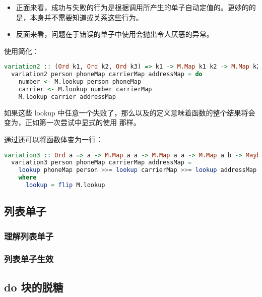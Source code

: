 \documentclass[./main.tex]{subfiles}
\begin{document}
\begin{itemize}
  \item 正面来看，成功与失败的行为是根据调用所产生的单子自动定值的。更妙的的是，本身并不需要知道或关系这些行为。
  \item 反面来看，问题在于错误的单子中使用会抛出令人厌恶的异常。
\end{itemize}

使用简化：

\begin{lstlisting}[language=Haskell]
  variation2 :: (Ord k1, Ord k2, Ord k3) => k1 -> M.Map k1 k2 -> M.Map k2 k3 -> M.Map k3 b -> Maybe b
  variation2 person phoneMap carrierMap addressMap = do
    number <- M.lookup person phoneMap
    carrier <- M.lookup number carrierMap
    M.lookup carrier addressMap
\end{lstlisting}

如果这些 lookup 中任意一个失败了，那么\acode{(>>=)}以及\acode{(>>)}的定义意味着函数的整个结果将会变为，正如第一次尝试中显式的使用
那样。

通过还可以将函数体变为一行：

\begin{lstlisting}[language=Haskell]
  variation3 :: Ord a => a -> M.Map a a -> M.Map a a -> M.Map a b -> Maybe b
  variation3 person phoneMap carrierMap addressMap =
    lookup phoneMap person >>= lookup carrierMap >>= lookup addressMap
    where
      lookup = flip M.lookup
\end{lstlisting}

\subsection*{列表单子}


\subsubsection*{理解列表单子}

\subsubsection*{列表单子生效}

\subsection*{do 块的脱糖}
\end{document}
